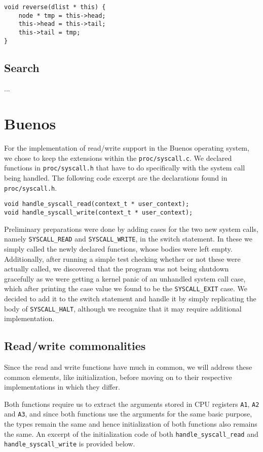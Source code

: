 \documentclass[11pt]{article}
\newcommand{\code}[1]{{\tt #1}}
\newcommand{\file}[1]{{\tt #1}}
\begin{document}
\begin{lstlisting}
void reverse(dlist * this) {
    node * tmp = this->head;
    this->head = this->tail;
    this->tail = tmp;
}
\end{lstlisting}

\subsection{Search}
...

\newpage
\section{Buenos}
For the implementation of read/write support in the Buenos operating system,
we chose to keep the extensions within the \file{proc/syscall.c}. We declared
functions in \file{proc/syscall.h} that have to do specifically with the
system call being handled. The following code excerpt are the declarations
found in \file{proc/syscall.h}.

\begin{lstlisting}
void handle_syscall_read(context_t * user_context);
void handle_syscall_write(context_t * user_context);
\end{lstlisting}

Preliminary preparations were done by adding cases for the two new system
calls, namely \code{SYSCALL\_READ} and \code{SYSCALL\_WRITE}, in the switch
statement. In these we simply called the newly declared functions, whose
bodies were left empty. Additionally, after running a simple test checking
whether or not these were actually called, we discovered that the program was
not being shutdown gracefully as we were getting a kernel panic of an
unhandled system call case, which after printing the case value we found to be
the \code{SYSCALL\_EXIT} case. We decided to add it to the switch statement
and handle it by simply replicating the body of \code{SYSCALL\_HALT}, although
we recognize that it may require additional implementation.

\subsection{Read/write commonalities}
Since the read and write functions have much in common, we will address these
common elements, like initialization, before moving on to their respective
implementations in which they differ.

Both functions require us to extract the arguments stored in CPU registers
\code{A1}, \code{A2} and \code{A3}, and since both functions use the arguments
for the same basic purpose, the types remain the same and hence initialization
of both functions also remains the same. An excerpt of the initialization code
of both \code{handle\_syscall\_read} and \code{handle\_syscall\_write} is
provided below.
\end{document}
